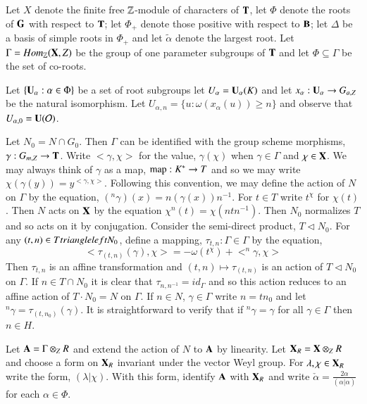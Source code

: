 Let $X$ denote the finite free $\mathbb{Z}$-module of characters of $\mathbf{T}$, let $\Phi$ denote the roots of $\mathbf{G}$ with respect to $\mathbf{T}$;  let $\Phi_{+}$ denote those positive with respect to $\mathbf{B}$; let $\Delta$ be a basis of simple roots in $\Phi_{+}$ and let $\tilde{\alpha}$ denote the largest root. Let $\Gamma = Hom_{\mathbb{Z}}(\mathbf{X}, Z)$ be the group of one parameter subgroups of $\mathbf{T}$ and let $\Phi \subseteq \Gamma$ be the set of co-roots.

Let $\{\mathbf{U}_{\alpha} : \alpha \in \Phi\}$ be a set of root subgroups let $U_{\alpha} = \mathbf{U}_{\alpha}(K)$ and let $x_{\alpha} : \mathbf{U}_{\alpha}\rightarrow G_{a, Z}$ be the natural isomorphism. Let $U_{\alpha,n} = \{u: \omega(x_{\alpha}(u)) \geq n \}$ and observe that $U_{\alpha, 0}=\mathbf{U}(\mathcal{O})$.

Let $N_{0} = N \cap G_{0}$. Then $\Gamma$ can be identified with the group scheme morphisms, $\gamma : G_{m, Z} \rightarrow \mathbf{T}$. Write $<\gamma, \chi>$ for the value, $\gamma(\chi)$ when $\gamma  \in \Gamma$ and $ \chi \in \mathbf{X}$. We  may always think of $\gamma$ as a map, $\operatorname{map}: K^{*}\rightarrow T$ and so we may write $\chi(\gamma(y)) = y^{<\gamma, \chi>}$. Following this convention, we may define the action of $N$ on $\Gamma$ by the equation, $(^{n}\gamma)(x) = n(\gamma(x))n^{-1}$. For $t \in T$ write $t^{\chi}$ for $\chi(t)$. Then $N$ acts on $\mathbf{X}$ by the equation $\chi^{n}(t) = \chi(ntn^{-1})$. Then $N_{0}$  normalizes $T$ and so acts on it by conjugation. Consider the semi-direct product, $T\triangleleft N_{0}$. For any $(t, n)\in T \\triangleleft N_{0}$, define a mapping, $\tau_{t, n} : \Gamma \in \Gamma$ by the equation,
$$
< \tau_{(t, n)}(\gamma), \chi > = -\omega(t^{\chi}) + <^{n}\gamma, \chi>
$$
Then $\tau_{t, n}$ is an affine transformation and $(t, n)\mapsto \tau_{(t,n)}$ is an action of $T \triangleleft N_{0}$ on $\Gamma$. If $n\in T \cap N_{0}$ it is clear that $\tau_{n,n^{-1}}= id_{\Gamma}$ and so this action reduces to an affine action of $T \cdot N_{0} = N$ on $\Gamma$. If $n \in N$, $\gamma \in \Gamma$ write $n=tn_{0}$ and let $^{n}\gamma =\tau_{(t, n_{0})}(\gamma)$. It is straightforward to verify that if $^{n}\gamma = \gamma$ for all $\gamma \in \Gamma$ then $n \in H$. 

Let $\mathbf{A} = \Gamma \otimes_{Z} R$ and extend the action of $N$ to $\mathbf{A}$ by linearity. Let $\mathbf{X}_{R} = \mathbf{X} \otimes_{Z} R $ and choose a form on $\mathbf{X}_{R}$ invariant under the vector Weyl group. For $\lambda, \chi \in \mathbf{X}_{R}$ write the form, $(\lambda|\chi)$. With this form, identify $\mathbf{A}$ with $\mathbf{X}_{R}$ and write $\check{\alpha} = \frac{2\alpha}{(\alpha | \alpha)}$ for each $\alpha \in \Phi$.

